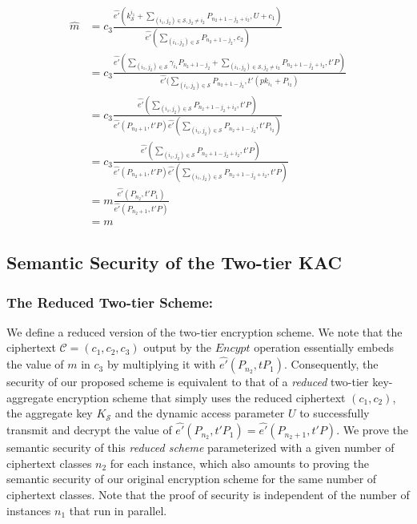 \begin{scriptsize}
\begin{equation}
\begin{split}
 \hat{m} &= c_3\frac{\hat{e'}(k^{i_1}_{\mathcal{S}}+\sum_{(i_1,j_2)\in\mathcal{S},j_2\neq i_2}P_{n_2+1-j_2+i_2},U+c_1)}{\hat{e'}(\sum_{(i_1,j_2)\in\mathcal{S}}P_{n_2+1-j_2},c_2)}\\
  &= c_3\frac{\hat{e'}(\sum_{(i_1,j_2)\in \mathcal{S}}{\gamma_{i_1}}P_{n_2+1-j_2} + \sum_{(i_1,j_2)\in\mathcal{S},j_2\neq i_2}P_{n_2+1-j_2+i_2},t'P)}{\hat{e'}(\sum_{(i_1,j_2)\in\mathcal{S}}P_{n_2+1-j_2},t'(pk_{i_1}+P_{i_2})}\\
  &= c_3\frac{\hat{e'}(\sum_{(i_1,j_2)\in\mathcal{S}}P_{n_2+1-j_2+i_2},t'P)}{\hat{e'}(P_{n_2+1},t'P)\hat{e'}(\sum_{(i_1,j_2)\in\mathcal{S}}P_{n_2+1-j_2},t'P_{i_2})}\\
  &= c_3\frac{\hat{e'}(\sum_{(i_1,j_2)\in\mathcal{S}}P_{n_2+1-j_2+i_2},t'P)}{\hat{e'}(P_{n_2+1},t'P)\hat{e'}(\sum_{(i_1,j_2)\in\mathcal{S}}P_{n_2+1-j_2+i_2},t'P)}\\
  &= m\frac{\hat{e'}(P_{n_2},t'P_1)}{\hat{e'}(P_{n_2+1},t'P)}\\
  &= m
\end{split}  
\end{equation}
\end{scriptsize}


\subsection{Semantic Security of the Two-tier KAC}
\label{subsec:proof_general}

\subsubsection{The Reduced Two-tier Scheme:}

We define a reduced version of the two-tier encryption scheme. We note that the ciphertext $\mathcal{C}=(c_1,c_2,c_3)$ output by the $Encypt$ operation essentially embeds the value of $m$ in $c_3$ by multiplying it with $\hat{e'}(P_{n_2},tP_1)$. Consequently, the security of our proposed scheme is equivalent to that of a \emph{reduced} two-tier key-aggregate encryption scheme that simply uses the reduced ciphertext $(c_1,c_2)$, the aggregate key $K_{\mathcal{S}}$ and the dynamic access parameter $U$ to successfully transmit and decrypt the value of $\hat{e'}(P_{n_2},t'P_1)=\hat{e'}(P_{n_2+1},t'P)$. We prove the semantic security of this \emph{reduced scheme} parameterized with a given number of ciphertext classes $n_2$ for each instance, which also amounts to proving the semantic security of our original encryption scheme for the same number of ciphertext classes. Note that the proof of security is independent of the number of instances $n_1$ that run in parallel.

